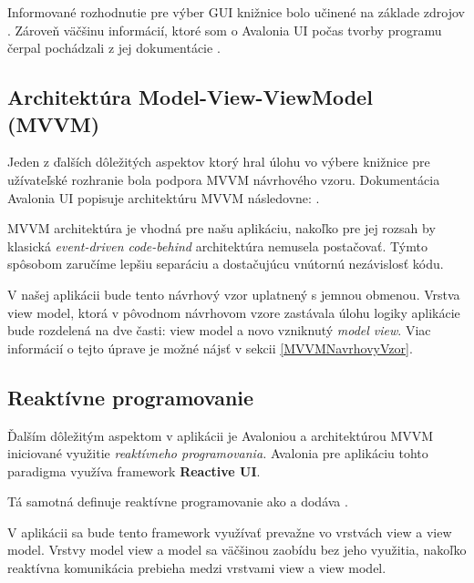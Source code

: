 Informované rozhodnutie pre výber GUI knižnice bolo učinené na základe zdrojov \cite{WpfGuide,WhatIsMAUI,AvaloniaMauiComparison}. Zároveň väčšinu informácií, ktoré som o Avalonia UI počas tvorby programu čerpal pochádzali z jej dokumentácie \cite{AvaloniaDokumentacia}.

\subsection{Architektúra Model-View-ViewModel (MVVM)}\label{ArchitekturaMVVM}

Jeden z ďalších dôležitých aspektov ktorý hral úlohu vo výbere knižnice pre užívateľské rozhranie bola podpora MVVM návrhového vzoru. Dokumentácia Avalonia UI popisuje architektúru MVVM následovne: \cite{MVVMDefByAvalonia}.

MVVM architektúra je vhodná pre našu aplikáciu, nakoľko pre jej rozsah by klasická \textit{event-driven code-behind} architektúra nemusela postačovať. Týmto spôsobom zaručíme lepšiu separáciu a dostačujúcu vnútornú nezávislosť kódu.    

V našej aplikácii bude tento návrhový vzor uplatnený s jemnou obmenou. Vrstva view model, ktorá v pôvodnom návrhovom vzore zastávala úlohu logiky aplikácie bude rozdelená na dve časti: view model a novo vzniknutý \textit{model view}. Viac informácií o tejto úprave je možné nájsť v sekcii \ref{MVVMNavrhovyVzor}. 

\subsection{Reaktívne programovanie}

Ďalším dôležitým aspektom v aplikácii je Avaloniou a architektúrou MVVM iniciované využitie \textit{reaktívneho programovania.} Avalonia pre aplikáciu tohto paradigma využíva framework \textbf{Reactive UI}. 

Tá samotná definuje reaktívne programovanie ako  a dodáva \cite{ReactiveProgrammingByReactiveUI}.

V aplikácii sa bude tento framework využívať prevažne vo vrstvách view a view model. Vrstvy model view a model sa väčšinou zaobídu bez jeho využitia, nakoľko reaktívna komunikácia prebieha medzi vrstvami view a view model.   